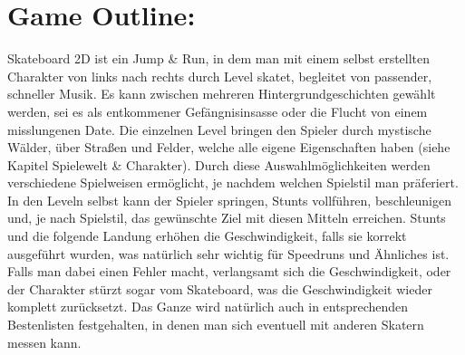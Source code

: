 \documentclass[paper=a4,fontsize=12pt,ngerman]{scrartcl}
\begin{document}
\pagestyle{plain}



\clearpage

\section*{Game Outline:}
Skateboard 2D ist ein Jump \& Run, in dem man mit einem selbst erstellten Charakter von
links nach rechts durch Level skatet, begleitet von passender, schneller Musik.
Es kann zwischen mehreren Hintergrundgeschichten gewählt werden, sei es als
entkommener Gefängnisinsasse oder die Flucht von einem misslungenen Date. Die
einzelnen Level bringen den Spieler durch mystische Wälder, über Straßen und Felder,
welche alle eigene Eigenschaften haben (siehe Kapitel Spielewelt \& Charakter).
Durch diese Auswahlmöglichkeiten werden verschiedene Spielweisen ermöglicht, je
nachdem welchen Spielstil man präferiert.
In den Leveln selbst kann der Spieler springen, Stunts vollführen, beschleunigen und, je
nach Spielstil, das gewünschte Ziel mit diesen Mitteln erreichen. Stunts und die folgende
Landung erhöhen die Geschwindigkeit, falls sie korrekt ausgeführt wurden, was natürlich
sehr wichtig für Speedruns und Ähnliches ist.
Falls man dabei einen Fehler macht, verlangsamt sich die Geschwindigkeit, oder der
Charakter stürzt sogar vom Skateboard, was die Geschwindigkeit wieder komplett
zurücksetzt.
Das Ganze wird natürlich auch in entsprechenden Bestenlisten festgehalten, in denen man
sich eventuell mit anderen Skatern messen kann.

\clearpage

\end{document}
